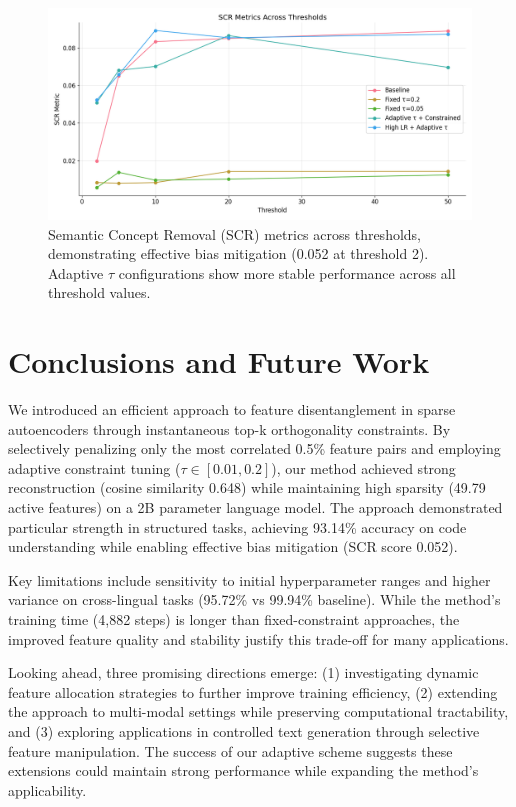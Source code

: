 \documentclass{article} %
\begin{document}
\begin{figure}[t]
    \centering
    \includegraphics[width=\linewidth]{scr_metrics_comparison.png}
    \caption{Semantic Concept Removal (SCR) metrics across thresholds, demonstrating effective bias mitigation (0.052 at threshold 2). Adaptive $\tau$ configurations show more stable performance across all threshold values.}
    \label{fig:scr_metrics}
\end{figure}


\section{Conclusions and Future Work}
\label{sec:conclusion}

We introduced an efficient approach to feature disentanglement in sparse autoencoders through instantaneous top-k orthogonality constraints. By selectively penalizing only the most correlated 0.5\% feature pairs and employing adaptive constraint tuning ($\tau \in [0.01, 0.2]$), our method achieved strong reconstruction (cosine similarity 0.648) while maintaining high sparsity (49.79 active features) on a 2B parameter language model. The approach demonstrated particular strength in structured tasks, achieving 93.14\% accuracy on code understanding while enabling effective bias mitigation (SCR score 0.052).

Key limitations include sensitivity to initial hyperparameter ranges and higher variance on cross-lingual tasks (95.72\% vs 99.94\% baseline). While the method's training time (4,882 steps) is longer than fixed-constraint approaches, the improved feature quality and stability justify this trade-off for many applications.

Looking ahead, three promising directions emerge: (1) investigating dynamic feature allocation strategies to further improve training efficiency, (2) extending the approach to multi-modal settings while preserving computational tractability, and (3) exploring applications in controlled text generation through selective feature manipulation. The success of our adaptive scheme suggests these extensions could maintain strong performance while expanding the method's applicability.



\end{document}
